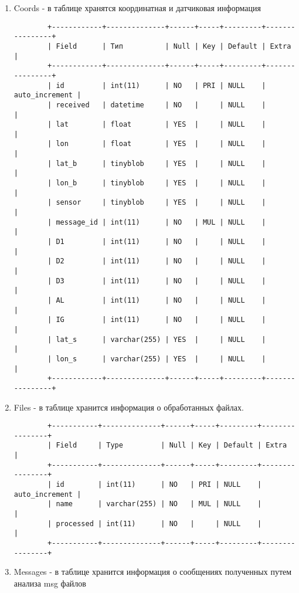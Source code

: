 ﻿\documentclass[12pt]{article}[a4paper,14pt,russian]
\begin{document}
	\begin{enumerate}
		\item Coords - в таблице хранятся координатная и датчиковая информация
		
			\begin{verbatim}
		+------------+--------------+------+-----+---------+----------------+
		| Field      | Тип          | Null | Key | Default | Extra          |
		+------------+--------------+------+-----+---------+----------------+
		| id         | int(11)      | NO   | PRI | NULL    | auto_increment |
		| received   | datetime     | NO   |     | NULL    |                |
		| lat        | float        | YES  |     | NULL    |                |
		| lon        | float        | YES  |     | NULL    |                |
		| lat_b      | tinyblob     | YES  |     | NULL    |                |
		| lon_b      | tinyblob     | YES  |     | NULL    |                |
		| sensor     | tinyblob     | YES  |     | NULL    |                |
		| message_id | int(11)      | NO   | MUL | NULL    |                |
		| D1         | int(11)      | NO   |     | NULL    |                |
		| D2         | int(11)      | NO   |     | NULL    |                |
		| D3         | int(11)      | NO   |     | NULL    |                |
		| AL         | int(11)      | NO   |     | NULL    |                |
		| IG         | int(11)      | NO   |     | NULL    |                |
		| lat_s      | varchar(255) | YES  |     | NULL    |                |
		| lon_s      | varchar(255) | YES  |     | NULL    |                |
		+------------+--------------+------+-----+---------+----------------+
		\end{verbatim}
		\item Files - в таблице хранится информация о обработанных файлах.
		
			\begin{verbatim}
		+-----------+--------------+------+-----+---------+----------------+
		| Field     | Type         | Null | Key | Default | Extra          |
		+-----------+--------------+------+-----+---------+----------------+
		| id        | int(11)      | NO   | PRI | NULL    | auto_increment |
		| name      | varchar(255) | NO   | MUL | NULL    |                |
		| processed | int(11)      | NO   |     | NULL    |                |
		+-----------+--------------+------+-----+---------+----------------+
		\end{verbatim}
		\item Messages - в таблице хранится информация о сообщениях полученных путем анализа msg файлов


\end{enumerate}
\end{document}
